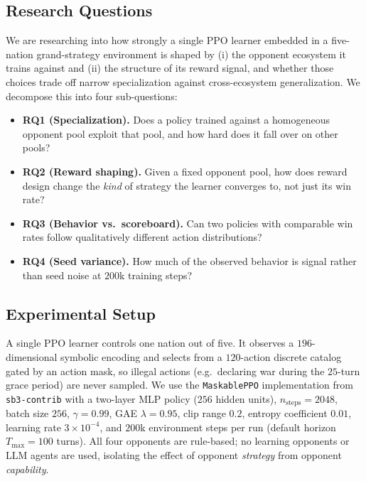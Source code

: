 \documentclass[11pt, a4paper, onecolumn]{article} %
\begin{document}
\subsection{Research Questions}
\label{sec:rqs}

We are researching into how strongly a single PPO learner embedded in a five-nation
grand-strategy environment is shaped by (i) the opponent ecosystem it trains
against and (ii) the structure of its reward signal, and whether those choices
trade off narrow specialization against cross-ecosystem generalization. We
decompose this into four sub-questions:

\begin{itemize}
    \item \textbf{RQ1 (Specialization).} Does a policy trained against a
          homogeneous opponent pool exploit that pool, and how hard does it
          fall over on other pools?
    \item \textbf{RQ2 (Reward shaping).} Given a fixed opponent pool, how does
          reward design change the \emph{kind} of strategy the learner
          converges to, not just its win rate?
    \item \textbf{RQ3 (Behavior vs.\ scoreboard).} Can two policies with
          comparable win rates follow qualitatively different action
          distributions?
    \item \textbf{RQ4 (Seed variance).} How much of the observed behavior is
          signal rather than seed noise at $200$k training steps?
\end{itemize}

\subsection{Experimental Setup}
\label{sec:setup}

A single PPO learner controls one nation out of five. It observes a
$196$-dimensional symbolic encoding and selects from a $120$-action discrete
catalog gated by an action mask, so illegal actions (e.g.\ declaring war
during the $25$-turn grace period) are never sampled. We use the
\texttt{MaskablePPO} implementation from \texttt{sb3-contrib} with a two-layer
MLP policy ($256$ hidden units), $n_{\text{steps}}{=}2048$, batch size $256$,
$\gamma{=}0.99$, GAE $\lambda{=}0.95$, clip range $0.2$, entropy coefficient
$0.01$, learning rate $3{\times}10^{-4}$, and $200$k environment steps per
run (default horizon $T_{\max}{=}100$ turns). All four opponents are
rule-based; no learning opponents or LLM agents are used, isolating the effect
of opponent \emph{strategy} from opponent \emph{capability}.
\end{document}
